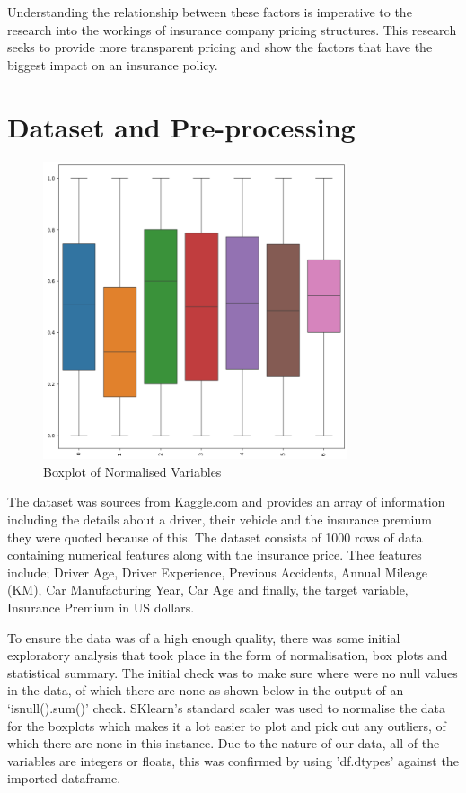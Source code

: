 \documentclass{article}
\begin{document}
Understanding the relationship between these factors is imperative to the research into the workings of insurance company pricing structures. This research seeks to provide more transparent pricing and show the factors that have the biggest impact on an insurance policy.

\newpage
\section{Dataset and Pre-processing}

\begin{figure}[h]
\centering
\includegraphics[width=0.8\textwidth]{boxplot.png}
\caption{Boxplot of Normalised Variables}\label{fig:boxplot}
\end{figure}

The dataset was sources from Kaggle.com and provides an array of information including the details about a driver, their vehicle and the insurance premium they were quoted because of this\cite{Sriram_2025}. The dataset consists of 1000 rows of data containing numerical features along with the insurance price. Thee features include; Driver Age, Driver Experience, Previous Accidents, Annual Mileage (KM), Car Manufacturing Year, Car Age and finally, the target variable, Insurance Premium in US dollars.  

To ensure the data was of a high enough quality, there was some initial exploratory analysis that took place in the form of normalisation, box plots and statistical summary. The initial check was to make sure where were no null values in the data, of which there are none as shown below in the output of an `isnull().sum()' check. SKlearn's standard scaler \cite{scikit_scaler} was used to normalise the data for the boxplots which makes it a lot easier to plot and pick out any outliers, of which there are none in this instance. Due to the nature of our data, all of the variables are integers or floats, this was confirmed by using 'df.dtypes' against the imported dataframe.
\end{document}
